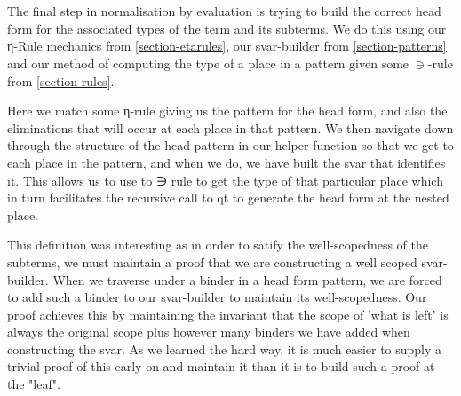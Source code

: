 {\begin{code}
%
\>[30]\AgdaSymbol{=}\AgdaSpace{}%
\AgdaSpace{}%
\AgdaSymbol{(}\AgdaSpace{}%
\AgdaSymbol{)}\<%
\\
%
\>[4]\AgdaSpace{}%
\AgdaSymbol{\{}\AgdaSymbol{\}}\AgdaSpace{}%
\AgdaSymbol{(}\AgdaSpace{}%
\AgdaSpace{}%
\AgdaSymbol{)}\AgdaSpace{}%
%
\>[28]\AgdaSymbol{=}\AgdaSpace{}%
\AgdaSpace{}%
\AgdaSpace{}%
\AgdaSpace{}%
\<%
\\
\>[0]\AgdaSymbol{\{-\#}\AgdaSpace{}%
\AgdaSpace{}%
\AgdaSymbol{\#-\}}\<%
\end{code}
}

The final step in normalisation by evaluation is trying to build the correct head
form for the associated types of the term and its subterms. We do this using our
η-Rule mechanics from \ref{section-etarules}, our svar-builder from \ref{section-patterns}
and our method of computing the type of a place in a pattern given some $∋$-rule
from \ref{section-rules}.

Here we match some η-rule giving us the pattern for the head form, and also the
eliminations that will occur at each place in that pattern. We then navigate down
through the structure of the head pattern in our helper function so that we
get to each place in the pattern, and when we do, we have built the svar that
identifies it. This allows us to use to ∋ rule to get the type of that particular
place which in turn facilitates the recursive call to qt to generate the head form
at the nested place.

This definition was interesting as in order to satify the well-scopedness of
the subterms, we must maintain a proof that we are constructing a well scoped
svar-builder. When we traverse under a binder in a head form pattern, we are forced
to add such a binder to our svar-builder to maintain its well-scopedness. Our proof
achieves this by maintaining the invariant that the scope of 'what is left' is
always the original scope plus however many binders we have added when constructing
the svar. As we learned the hard way, it is much easier to supply a trivial proof
of this early on and maintain it than it is to build such a proof at the "leaf".

